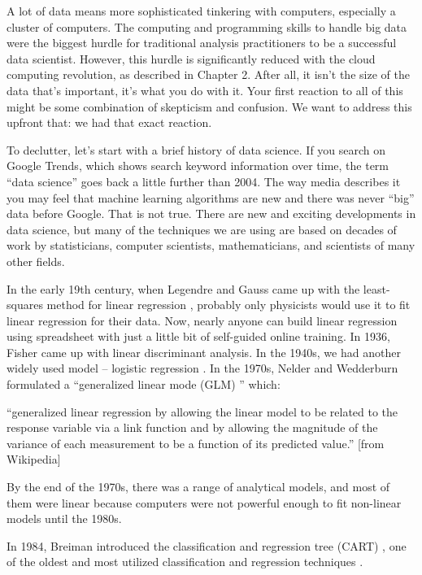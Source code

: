 \documentclass[
  12pt,
]{krantz}
\renewenvironment{quote}{\begin{VF}}{\end{VF}}
\begin{document}
A lot of data means more sophisticated tinkering with computers, especially a cluster of computers. The computing and programming skills to handle big data were the biggest hurdle for traditional analysis practitioners to be a successful data scientist. However, this hurdle is significantly reduced with the cloud computing revolution, as described in Chapter 2. After all, it isn't the size of the data that's important, it's what you do with it. Your first reaction to all of this might be some combination of skepticism and confusion. We want to address this upfront that: we had that exact reaction.

To declutter, let's start with a brief history of data science. If you search on Google Trends, which shows search keyword information over time, the term ``data science'' goes back a little further than 2004. The way media describes it you may feel that machine learning algorithms are new and there was never ``big'' data before Google. That is not true. There are new and exciting developments in data science, but many of the techniques we are using are based on decades of work by statisticians, computer scientists, mathematicians, and scientists of many other fields.

In the early 19th century, when Legendre and Gauss came up with the least-squares method for linear regression , probably only physicists would use it to fit linear regression for their data. Now, nearly anyone can build linear regression using spreadsheet with just a little bit of self-guided online training. In 1936, Fisher came up with linear discriminant analysis. In the 1940s, we had another widely used model -- logistic regression . In the 1970s, Nelder and Wedderburn formulated a ``generalized linear mode (GLM)  '' which:

\begin{quote}
``generalized linear regression by allowing the linear model to be related to the response variable via a link function and by allowing the magnitude of the variance of each measurement to be a function of its predicted value.'' {[}from Wikipedia{]}
\end{quote}

By the end of the 1970s, there was a range of analytical models, and most of them were linear because computers were not powerful enough to fit non-linear models until the 1980s.

In 1984, Breiman introduced the classification and regression tree (CART)  , one of the oldest and most utilized classification and regression techniques \citep{Breiman1984}.
\end{document}
